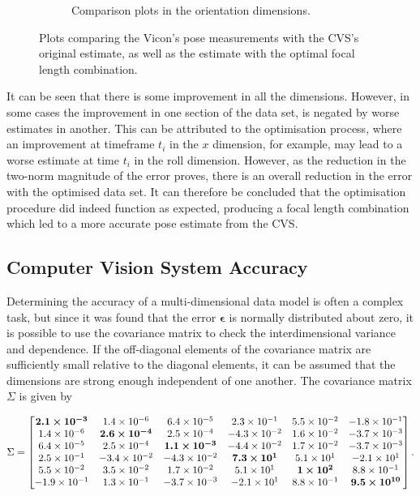\begin{figure}
\begin{subfigure}{0.48\textwidth}
\begin{subfigure}{\textwidth}
    \end{subfigure}
    \caption{Comparison plots in the orientation dimensions.}
  \end{subfigure}
  \caption[Plots comparing the Vicon's measurements with the CVS's original and improved measurements. ]{Plots comparing the Vicon's pose measurements with the CVS's original estimate, as well as the estimate with the optimal focal length combination.}
  \label{fig:estimate}
\end{figure}

It can be seen that there is some improvement in all the dimensions. However, in some cases the improvement in one section of the data set, is negated by worse estimates in another. This can be attributed to the optimisation process, where an improvement at timeframe $t_i$ in the $x$ dimension, for example, may lead to a worse estimate at time $t_i$ in the roll dimension. However, as the reduction in the two-norm magnitude of the error proves, there is an overall reduction in the error with the optimised data set. It can therefore be concluded that the optimisation procedure did indeed function as expected, producing a focal length combination which led to a more accurate pose estimate from the CVS. 

\subsection{Computer Vision System Accuracy}

Determining the accuracy of a multi-dimensional data model is often a complex task, but since it was found that the error $\bm{\epsilon}$ is normally distributed about zero, it is possible to use the covariance matrix to check the interdimensional variance and dependence. If the off-diagonal elements of the covariance matrix are sufficiently small relative to the diagonal elements, it can be assumed that the dimensions are strong enough independent of one another. The covariance matrix $\Sigma$ is given by  

\begin{equation}
  \label{eq:covariance-matrix}
  \Sigma = 
  \begin{bmatrix}
    \bm{2.1\times 10^{-3}} & 1.4\times 10^{-6}      & 6.4\times 10^{-5}       & 2.3\times 10^{-1}     &  5.5\times 10^{-2}   & -1.8\times 10^{-1}     \\ 
    1.4\times 10^{-6}      & \bm{2.6\times 10^{-4}} & 2.5\times 10^{-4}       & -4.3\times 10^{-2}    &  1.6\times 10^{-2}   & -3.7\times 10^{-3}     \\
    6.4\times 10^{-5}      & 2.5\times 10^{-4}      & \bm{1.1\times 10^{-3}}  & -4.4\times 10^{-2}    &  1.7\times 10^{-2}   & -3.7\times 10^{-3}     \\
    2.5\times 10^{-1}      & -3.4\times 10^{-2}     & -4.3\times 10^{-2}      & \bm{7.3\times 10^{1}} &  5.1\times 10^{1}    & -2.1\times 10^{1}      \\
    5.5\times 10^{-2}      & 3.5\times 10^{-2}      & 1.7\times 10^{-2}       & 5.1\times 10^{1}      &  \bm{1\times 10^{2}} & 8.8\times 10^{-1}      \\
    -1.9\times 10^{-1}     & 1.3\times 10^{-1}      & -3.7\times 10^{-3}      & -2.1\times 10^{1}     &  8.8\times 10^{-1}   & \bm{9.5\times 10^{10}} \\
  \end{bmatrix}.
\end{equation}

